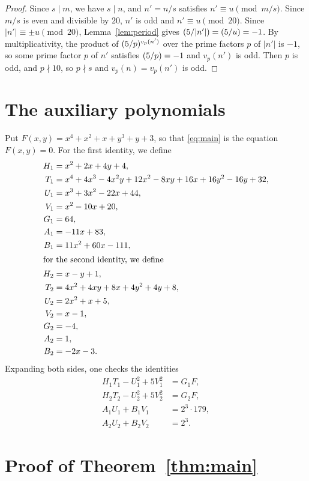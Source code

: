 \documentclass[11pt]{article}
\newcommand{\leg}[2]{\mathchoice{\biggl(\dfrac{#1}{#2}\biggr)}{(#1/#2)}{(#1/#2)}{(#1/#2)}}
\begin{document}
\begin{proof}
Since $s\mid m$, we have $s\mid n$, and $n'=n/s$ satisfies $n'\equiv u\pmod{m/s}$. Since $m/s$ is even and divisible by $20$, $n'$ is odd and $n'\equiv u\pmod{20}$. Since $|n'|\equiv\pm u\pmod{20}$, Lemma~\ref{lem:period} gives $\leg{5}{|n'|}=\leg{5}{u}=-1$. By multiplicativity, the product of $\leg{5}{p}^{v_p(n')}$ over the prime factors $p$ of $|n'|$ is $-1$, so some prime factor $p$ of $n'$ satisfies $\leg{5}{p}=-1$ and $v_p(n')$ is odd. Then $p$ is odd, and $p\nmid10$, so $p\nmid s$ and $v_p(n)=v_p(n')$ is odd.
\end{proof}

\section{The auxiliary polynomials}

Put $F(x,y)=x^{4}+x^{2}+x+y^{3}+y+3$, so that \eqref{eq:main} is the equation $F(x,y)=0$.
For the first identity, we define
\begin{align*}
H_{1}&=x^{2}+2x+4y+4,\\
T_{1}&=x^{4}+4x^{3}-4x^{2}y+12x^{2}-8xy+16x+16y^{2}-16y+32,\\
U_{1}&=x^{3}+3x^{2}-22x+44,\\
V_{1}&=x^{2}-10x+20,\\
G_{1}&=64,\\
A_{1}&=-11x+83,\\
B_{1}&=11x^{2}+60x-111,\\
\intertext{for the second identity, we define}
H_{2}&=x-y+1,\\
T_{2}&=4x^{2}+4xy+8x+4y^{2}+4y+8,\\
U_{2}&=2x^{2}+x+5,\\
V_{2}&=x-1,\\
G_{2}&=-4,\\
A_{2}&=1,\\
B_{2}&=-2x-3.
\end{align*}
Expanding both sides, one checks the identities
\begin{align}
H_{1}T_{1}-U_{1}^2+5V_{1}^2&=G_{1}F,\label{eq:norm1}\\
H_{2}T_{2}-U_{2}^2+5V_{2}^2&=G_{2}F,\label{eq:norm2}\\
A_{1}U_{1}+B_{1}V_{1}&=2^{3}\cdot 179,\label{eq:bez1}\\
A_{2}U_{2}+B_{2}V_{2}&=2^{3}.\label{eq:bez2}
\end{align}

\section{Proof of Theorem~\ref{thm:main}}
\end{document}
